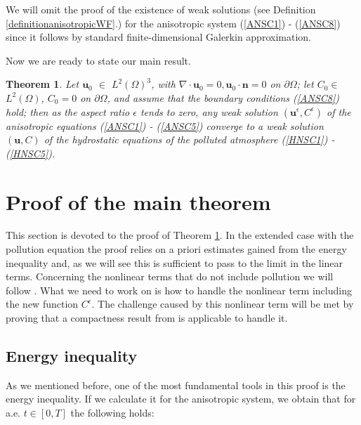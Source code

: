 \documentclass[11pt]{article}
\newtheorem{theorem}{Theorem}
\begin{document}
We will omit the proof of the existence of weak solutions (see Definition \ref{definitionanisotropicWF}.) for the anisotropic system (\ref{ANSC1}) - (\ref{ANSC8}) since it follows by standard finite-dimensional Galerkin approximation.

Now we are ready to state our main result.
  
\begin{theorem} \label{maintheorem}
  Let $\mathbf{u}_0$ $\in$ $L^2 (\Omega)^3$, with $\nabla \cdot \mathbf{u}_0 = 0, \mathbf{u}_0 \cdot \mathbf{n} = 0$ on $\partial \Omega$; let $C_0 \in$ $L^2 (\Omega)$, $C_0 = 0$ on $ \partial \Omega$, and assume that the boundary conditions (\ref{ANSC8}) hold; then as the aspect ratio $\epsilon$ tends to zero, any weak solution $(\mathbf{u}^\epsilon, C^\epsilon)$ of the anisotropic equations (\ref{ANSC1}) - (\ref{ANSC5}) converge to a weak solution $(\mathbf{u}, C)$ of the hydrostatic equations of the polluted atmosphere (\ref{HNSC1}) - (\ref{HNSC5}).
\end{theorem}

\section{Proof of the main theorem} \label{proof}
 
 This section is devoted to the proof of Theorem \ref{maintheorem}. In the extended case with the pollution equation the proof relies on a priori estimates gained from the energy inequality and, as we will see this is sufficient to pass to the limit in the linear terms. Concerning the nonlinear terms that do not include pollution we will follow \cite{azerad2001mathematical}. What we need to work on is how to handle the nonlinear term including the new function $C^\epsilon.$ The challenge caused by this nonlinear term will be met by proving that a compactness result from \cite{lions1996mathematical} is applicable to handle it.

  \subsection{Energy inequality}
  
  As we mentioned before, one of the most fundamental tools in this proof is the energy inequality. If we calculate it for the anisotropic system, we obtain that for a.e. $t \in [0,T]$ the following holds:
  
\end{document}
